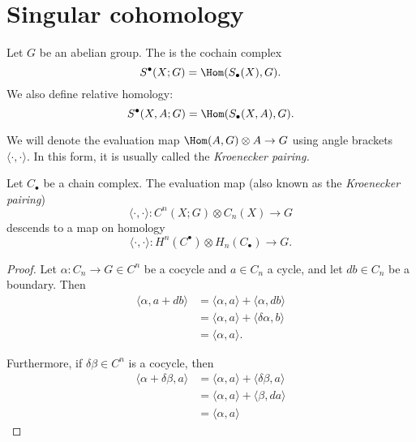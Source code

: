 \documentclass[main.tex]{subfiles}
\begin{document}
\section{Singular cohomology}
\label{sec:singular_cohomology}

\begin{definition}
  \label{def:singular_cohomology}
  Let $G$ be an abelian group. The  is the cochain complex
  \begin{equation*}
    S^{\bullet}(X; G) = \Hom(S_{\bullet}(X), G).
  \end{equation*}
  We also define relative homology:
  \begin{equation*}
    S^{\bullet}(X, A; G) = \Hom(S_{\bullet}(X, A), G).
  \end{equation*}
\end{definition}

We will denote the evaluation map $\Hom(A, G) \otimes A \to G$ using angle brackets $\langle \cdot,\cdot \rangle$. In this form, it is usually called the \emph{Kroenecker pairing.}

\begin{lemma}
  \label{lemma:kroenecker_pairing_descends_to_homology}
  Let $C_{\bullet}$ be a chain complex. The evaluation map (also known as the \emph{Kroenecker pairing})
  \begin{equation*}
    \langle \cdot,\cdot \rangle\colon C^{n}(X; G) \otimes C_{n}(X) \to G
  \end{equation*}
  descends to a map on homology
  \begin{equation*}
    \langle \cdot,\cdot \rangle\colon H^{n}(C^{\bullet}) \otimes H_{n}(C_{\bullet}) \to G.
  \end{equation*}
\end{lemma}
\begin{proof}
  Let $\alpha\colon C_{n} \to G \in C^{n}$ be a cocycle and $a \in C_{n}$ a cycle, and let $d b \in C_{n}$ be a boundary. Then
  \begin{align*}
    \langle \alpha, a + db \rangle &= \langle \alpha, a \rangle + \langle \alpha, db \rangle \\
    &= \langle \alpha, a \rangle + \langle \delta \alpha, b \rangle \\
    &= \langle \alpha, a \rangle.
  \end{align*}

  Furthermore, if $\delta \beta \in C^{n}$ is a cocycle, then
  \begin{align*}
    \langle \alpha + \delta \beta, a \rangle &= \langle \alpha, a \rangle + \langle \delta \beta, a \rangle \\
    &= \langle \alpha, a \rangle + \langle \beta, d a \rangle \\
    &= \langle \alpha, a \rangle
  \end{align*}
\end{proof}
\end{document}
